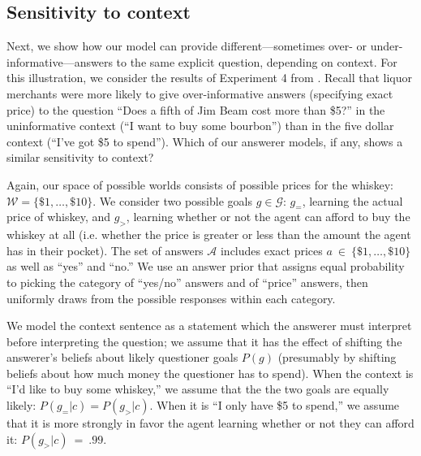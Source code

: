 \documentclass[12pt, floatsintext, jou]{apa6}
\begin{document}
\subsection{Sensitivity to context}

Next, we show how our model can provide different---sometimes over- or under-informative---answers to the same explicit question, depending on context. For this illustration, we consider the results of Experiment 4 from . Recall that liquor merchants were more likely to give over-informative answers (specifying exact price) to the question ``Does a fifth of Jim Beam cost more than \$5?'' in the uninformative context (``I want to buy some bourbon'') than in the five dollar context (``I've got \$5 to spend''). Which of our answerer models, if any, shows a similar sensitivity to context?

Again, our space of possible worlds consists of possible prices for the whiskey: $\mathcal{W} = \{\$1, \dots, \$10\}$. We consider two possible goals $g \in \mathcal{G}$: $g_=$, learning the actual price of whiskey,  and $g_>$, learning whether or not the agent can afford to buy the whiskey at all (i.e. whether the price is greater or less than the amount the agent has in their pocket). The set of answers $\mathcal{A}$ includes exact prices $a~\in~\{\$1, \dots, \$10\}$ as well as ``yes'' and ``no.'' We use an answer prior that assigns equal probability to picking the category of ``yes/no'' answers and of ``price'' answers, then uniformly draws from the possible responses within each category. 


We model the context sentence as a statement which the answerer must interpret before interpreting the question; we assume that it has the effect of shifting the answerer's beliefs about likely questioner goals $P(g)$ (presumably by shifting beliefs about how much money the questioner has to spend). When the context is ``I'd like to buy some whiskey,'' we assume that the the two goals are equally likely: $P(g_= | c) = P(g_> | c)$. When it is ``I only have \$5 to spend,'' we assume that it is more strongly in favor the agent learning whether or not they can afford it: $P(g_> | c)~=~.99$. 
\end{document}
